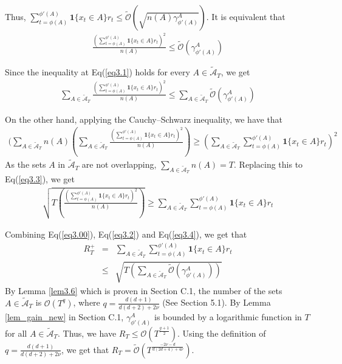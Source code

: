 \documentclass[twoside]{article}
\begin{document}
Thus, $\sum_{t =\phi(A)}^{\phi'(A)} \textbf{1}\{x_t \in A\}r_t \le \tilde{\mathcal O}(\sqrt{n(A)\gamma^A_{\phi'(A)}})$. It is equivalent that
\begin{eqnarray}
\frac{(\sum_{t =\phi(A)}^{\phi'(A)} \textbf{1}\{x_t \in A\}r_t)^2}{n(A)} \le \tilde{\mathcal O}(\gamma^A_{\phi'(A)})
\label{eq3.1}
\end{eqnarray}

Since the inequality at Eq(\ref{eq3.1}) holds for every $A \in \tilde{\mathcal A}_T$, we get
\begin{eqnarray}
\sum_{A \in \tilde{\mathcal A}_T} \frac{(\sum_{t =\phi(A)}^{\phi'(A)} \textbf{1}\{x_t \in A\}r_t)^2}{n(A)} \le \sum_{A \in \tilde{\mathcal A}_T} \tilde{\mathcal O}(\gamma^A_{\phi'(A)})
\label{eq3.2}
\end{eqnarray}

On the other hand, applying the Cauchy–Schwarz inequality, we have that
\begin{eqnarray}
(\sum_{A \in \tilde{\mathcal A}_T} n(A)(\sum_{A \in \tilde{\mathcal A}_T} \frac{(\sum_{t =\phi(A)}^{\phi'(A)} \textbf{1}\{x_t \in A\}r_t)^2}{n(A)}) \ge (\sum_{A \in \tilde{\mathcal A}_T} \sum_{t =\phi(A)}^{\phi'(A)} \textbf{1}\{x_t \in A\}r_t)^2
\label{eq3.3}
\end{eqnarray}
As the sets $A$ in $\tilde{\mathcal A}_T$ are not overlapping, $\sum_{A \in \tilde{\mathcal A}_T} n(A) = T$. Replacing this to Eq(\ref{eq3.3}), we get
\begin{eqnarray}
\sqrt{T(\frac{(\sum_{t =\phi(A)}^{\phi'(A)} \textbf{1}\{x_t \in A\}r_t)^2}{n(A)})} \ge \sum_{A \in \tilde{\mathcal A}_T} \sum_{t =\phi(A)}^{\phi'(A)} \textbf{1}\{x_t \in A\}r_t
\label{eq3.4}
\end{eqnarray}

Combining Eq(\ref{eq3.00}), Eq(\ref{eq3.2}) and Eq(\ref{eq3.4}), we get that
\begin{eqnarray}
R^+_T  &=& \sum_{A \in \tilde{\mathcal A}_T} \sum_{t =\phi(A)}^{\phi'(A)} \textbf{1}\{x_t \in A\}r_t \\
& \le & \sqrt{T (\sum_{A \in \tilde{\mathcal A}_T}\tilde{\mathcal O}(\gamma^A_{\phi'(A)}))}
\label{eq3.5}
\end{eqnarray}
By Lemma \ref{lem3.6} which is proven in Section C.1, the number of the sets $A \in \tilde{\mathcal A}_T$ is $\mathcal O(T^q)$, where $q = \frac{d(d+1)}{d(d+2) + 2\nu}$ (See Section 5.1). By Lemma \ref{lem_gain_new} in Section C.1, $\gamma^A_{\phi'(A)}$ is bounded by a logarithmic function in $T$ for all $A \in \tilde{\mathcal A}_T$. Thus, we have $R_T \le \mathcal O(T^{\frac{q+1}{2}})$. Using the definition of $q = \frac{d(d+1)}{d(d+2) + 2\nu}$, we get that $R_T = \tilde{\mathcal O}(T^{\frac{-2\nu -d}{d(2d+4) + 4\nu}})$.
\end{document}
